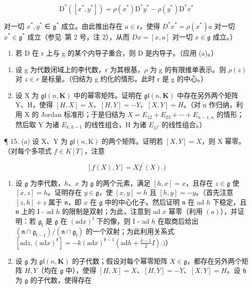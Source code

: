 \[
\mathrm{D} ^ {*} ([ x ^ {*}, y ^ {*} ]) = \rho (x ^ {*}) \mathrm{D} ^ {*} y ^ {*} - \rho (y ^ {*}) \mathrm{D} ^ {*} x ^ {*}
\]

对一切 \(x^{*}, y^{*}\) ∈ \(\mathfrak{g}^{*}\) 成立。由此推出存在 \(a \in \mathfrak{c}\)，使得 \(D^{*}x^{*} = \rho(x^{*})a\) 对一切 \(x^{*} \in \mathfrak{g}^{*}\) 成立（参见~第 2 号，注 2），从而 \(Dx = [x, a]\) 对一切 \(x \in \mathfrak{g}\) 成立。）

\begin{enumerate}
\def\labelenumi{(\alph{enumi})}
\setcounter{enumi}{1}
\tightlist
\item
  若 D 在 r 上与 g 的某个内导子重合，则 D 是内导子。（应用 (a)。）
\end{enumerate}

\begin{enumerate}
\def\labelenumi{\arabic{enumi}.}
\setcounter{enumi}{12}
\item
  设 g 为代数闭域上的李代数，r 为其根基，\(\rho\) 为 g 的有限维单表示。则 \(\rho(z)\) 对 \(z \in r\) 是标量。（归结为 g 约化的情形。此时 r 是 g 的中心。）
\item
  设 X 为 \(\mathfrak{gl}(n, \mathbf{K})\) 中的幂零矩阵。证明在 \(\mathfrak{gl}(n, \mathbf{K})\) 中存在另外两个矩阵 Y、H，使得 \([H, X] = X\)、\([H, Y] = -Y\)、\([X, Y] = H\)。（对 n 作归纳，利用 X 的 Jordan 标准形；于是归结为 \(X = E_{12} + E_{23} + \cdots + E_{n-1,n}\) 的情形；然后取 Y 为诸 \(E_{k,k-1}\) 的线性组合，H 为诸 \(E_{jj'}\) 的线性组合。）
\end{enumerate}

¶ 15. (a) 设 X、Y 为 \(\mathfrak{gl}(n, \mathrm{K})\) 的两个矩阵。证明若 \([X, Y] = X\)，则 X 幂零。（对每个多项式 \(f \in K[T]\)，注意

\[
[ f (X), Y ] = X f ^ {\prime} (X).)
\]

\begin{enumerate}
\def\labelenumi{(\alph{enumi})}
\setcounter{enumi}{1}
\item
  设 \(\mathfrak{g}\) 为李代数，\(h\)、\(x\) 为 \(\mathfrak{g}\) 的两个元素，满足 \([h, x] = x\)，且存在 \(z \in \mathfrak{g}\) 使 \([x, z] = h\)。证明存在 \(y \in \mathfrak{g}\)，使 \([x, y] = h\) 且 \([h, y] = -y\)。（首先注意 \([z, h] + z\) 属于 \(\mathfrak{n}\)，即 \(x\) 在 \(\mathfrak{g}\) 中的中心化子。然后证明 \(\mathfrak{n}\) 在 ad \(h\) 下稳定，且 \(\mathfrak{n}\) 上的 I - ad \(h\) 的限制是双射；为此，注意到 ad \(x\) 幂零（利用 \((a)\)），并证明：若 \(\mathfrak{g}_{\mathfrak{l}}\) 是 \(\mathfrak{g}\) 在 \((\mathrm{ad}x)^{\mathfrak{l}}\) 下的像，则 I - ad \(h\) 在取商后给出 \((\mathfrak{n} \cap \mathfrak{g}_{\mathfrak{l}-1}) / (\mathfrak{n} \cap \mathfrak{g}_{\mathfrak{l}})\) 的一个双射；为此利用关系式 \([\mathrm{ad}z, (\mathrm{ad}x)^{\mathfrak{k}}] = -k(\mathrm{ad}x)^{\mathfrak{k}-1}(\mathrm{ad}h + \frac{k-1}{2}I).)\)）
\item
  设 \(\mathfrak{g}\) 为 \(\mathfrak{gl}(n, \mathbf{K})\) 的子代数；假设对每个幂零矩阵 \(X \in \mathfrak{g}\)，都存在另外两个矩阵 \(H, Y\)（均在 \(\mathfrak{g}\) 中），使得 \([H, X] = X\)、\([H, Y] = -Y\)、\([X, Y] = H\)。设 \(\mathfrak{h}\) 为 \(\mathfrak{g}\) 的子代数，使得存在
\end{enumerate}


